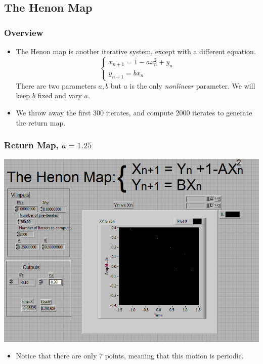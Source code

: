 \documentclass[9pt]{beamer}
\begin{document}
\subsection{The Henon Map}
\begin{frame}
	\frametitle{Overview}
	\begin{itemize}
		\item The Henon map is another iterative system, except with a different
			equation. 
			\[
				\begin{cases}
					x_{n + 1} = 1 - ax_n^2 + y_n\\
					y_{n + 1} = bx_n
				\end{cases}
			\]
			There are two parameters \( a, b \) but \( a  \) is the only
			\textit{nonlinear} parameter. We will keep \( b \) fixed and vary \( a
			\).   
		\item We throw away the first 300 iterates, and compute 2000 iterates to
			generate the return map.  
	\end{itemize}
\end{frame}

\begin{frame}
	\frametitle{Return Map, \( a = 1.25 \)}

	\begin{center}
		\includegraphics[scale=0.4]{images/HenonMap_1.25.PNG}
	\end{center}
	\begin{itemize}
		\item Notice that there are only 7 points, meaning that this motion is
			periodic. 
	\end{itemize}
\end{frame}
\end{document}
